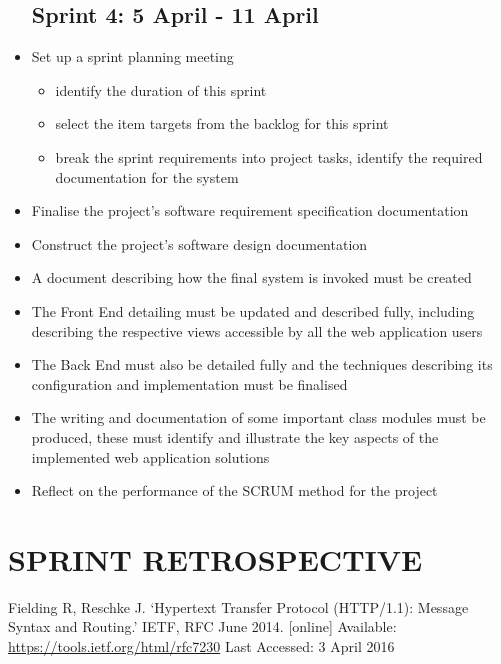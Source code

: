\documentclass[10pt,twocolumn]{witseiepaper}
\begin{document}
\begin{itemize}
		\subsection{Sprint 4: 5 April - 11 April}
		\item Set up a sprint planning meeting
		\begin{itemize}
			\item identify the duration of this sprint
			\item select the item targets from the backlog for this sprint
			\item break the sprint requirements into project tasks, identify the required documentation for the system
		\end{itemize}
		\item Finalise the project's software requirement specification documentation
		\item Construct the project's software design documentation
		\item A document describing how the final system is invoked must be created
		\item The Front End detailing must be updated and described fully, including describing the respective views accessible by all the web application users
		\item The Back End must also be detailed fully and the techniques describing its configuration and implementation must be finalised
		\item The writing and documentation of some important class modules must be produced, these must identify and illustrate the key aspects of the implemented web application solutions
		\item Reflect on the performance of the SCRUM method for the project
	\end{itemize}	

\section{SPRINT RETROSPECTIVE}



\newpage

\begin{thebibliography}{1}
	
	 Fielding R, Reschke J. `Hypertext Transfer Protocol (HTTP/1.1): Message Syntax and Routing.' IETF, RFC June 2014. [online] Available: \url{https://tools.ietf.org/html/rfc7230} Last Accessed: 3 April 2016
	
	
\end{thebibliography}
\end{document}
